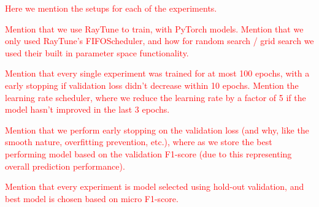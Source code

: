 \textcolor{red}{Here we mention the setups for each of the experiments.}

\textcolor{red}{Mention that we use RayTune to train, with PyTorch models. Mention that we only used RayTune's FIFOScheduler, and how for random search / grid search we used their built in parameter space functionality.}

\textcolor{red}{Mention that every single experiment was trained for at most 100 epochs, with a early stopping if validation loss didn't decrease within 10 epochs.
Mention the learning rate scheduler, where we reduce the learning rate by a factor of 5 if the model hasn't improved in the last 3 epochs.}

\textcolor{red}{Mention that we perform early stopping on the validation loss (and why, like the smooth nature, overfitting prevention, etc.), where as we store the best performing model based on the validation F1-score (due to this representing overall prediction performance).}

\textcolor{red}{Mention that every experiment is model selected using hold-out validation, and best model is chosen based on micro F1-score.}